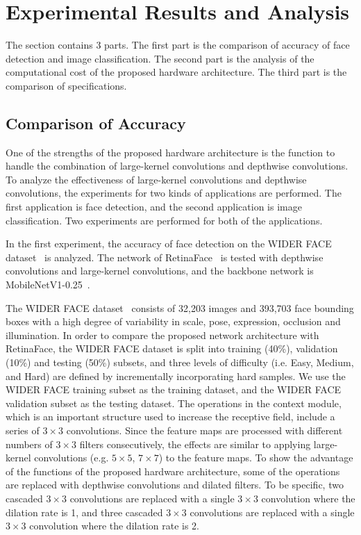 \documentclass[runningheads]{llncs}
\begin{document}
\section{Experimental Results and Analysis}
\label{sec:results}

The section contains 3 parts. The first part is the comparison of accuracy of face detection and image classification. The second part is the analysis of the computational cost of the proposed hardware architecture. The third part is the comparison of specifications.



\subsection{Comparison of Accuracy}
\label{subsec:comparison}

One of the strengths of the proposed hardware architecture is the function to handle the combination of large-kernel convolutions and depthwise convolutions. To analyze the effectiveness of large-kernel convolutions and depthwise convolutions, the experiments for two kinds of applications are performed. The first application is face detection, and the second application is image classification. Two experiments are performed for both of the applications.

In the first experiment, the accuracy of face detection on the WIDER FACE dataset~\cite{Yang16} is analyzed. The network of RetinaFace~\cite{Deng19} is tested with depthwise convolutions and large-kernel convolutions, and the backbone network is MobileNetV1-0.25~\cite{Howard17}. 

The WIDER FACE dataset~\cite{Yang16} consists of 32,203 images and 393,703 face bounding boxes with a high degree of variability in scale, pose, expression, occlusion and illumination. In order to compare the proposed network architecture with RetinaFace, the WIDER FACE dataset is split into training (40\%), validation (10\%) and testing (50\%) subsets, and three levels of difficulty (i.e. Easy, Medium, and Hard) are defined by incrementally incorporating hard samples. We use the WIDER FACE training subset as the training dataset, and the WIDER FACE validation subset as the testing dataset. The operations in the context module, which is an important structure used to increase the receptive field, include a series of $3 \times 3$ convolutions. Since the feature maps are processed with different numbers of $3 \times 3$ filters consecutively, the effects are similar to applying large-kernel convolutions (e.g. $5 \times 5$, $7 \times 7$) to the feature maps. To show the advantage of the functions of the proposed hardware architecture, some of the operations are replaced with depthwise convolutions and dilated filters. To be specific, two cascaded $3 \times 3$ convolutions are replaced with a single $3 \times 3$ convolution where the dilation rate is 1, and three cascaded $3 \times 3$ convolutions are replaced with a single $3 \times 3$ convolution where the dilation rate is 2.
\end{document}
